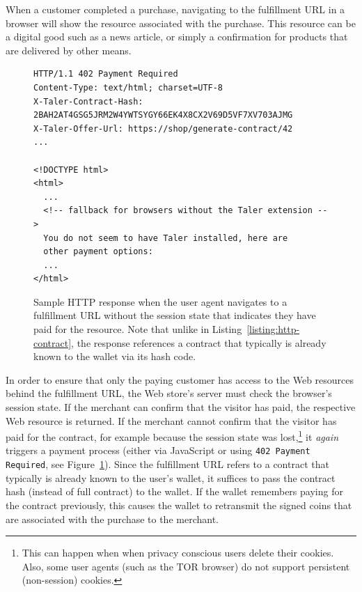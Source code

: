 \documentclass{llncs}
\begin{document}
When a customer completed a purchase, navigating to the fulfillment
URL in a browser will show the resource associated with the purchase.
This resource can be a digital good such as a news article, or simply
a confirmation for products that are delivered by other means.


\begin{figure}[t!]
\begin{lstlisting}
HTTP/1.1 402 Payment Required
Content-Type: text/html; charset=UTF-8
X-Taler-Contract-Hash: 2BAH2AT4GSG5JRM2W4YWTSYGY66EK4X8CX2V69D5VF7XV703AJMG
X-Taler-Offer-Url: https://shop/generate-contract/42
...

<!DOCTYPE html>
<html>
  ...
  <!-- fallback for browsers without the Taler extension -->
  You do not seem to have Taler installed, here are
  other payment options:
  ...
</html>
\end{lstlisting}
\caption{Sample HTTP response when the user agent navigates to a
  fulfillment URL without
  the session state that indicates they have paid for the resource.
  Note that unlike in Listing~\ref{listing:http-contract}, the response references
  a contract that typically is already known to the wallet via its hash code.}
  \label{listing:http-execute}
\end{figure}

In order to ensure that only the paying customer has access to the Web
resources behind the fulfillment URL, the Web store's server must
check the browser's session state.  If the merchant can confirm that
the visitor has paid, the respective Web resource is returned.  If the
merchant cannot confirm that the visitor has paid for the contract,
for example because the session state was lost,\footnote{This can
  happen when when privacy conscious users delete their cookies.
  Also, some user agents (such as the TOR browser) do not support
  persistent (non-session) cookies.} it {\em again} triggers a payment
process (either via JavaScript or using {\tt 402 Payment Required}, see Figure~\ref{listing:http-execute}).
Since the fulfillment URL refers to a contract that typically is already known
to the user's wallet, it suffices to pass the contract hash (instead of
full contract) to the wallet.
If the wallet remembers paying for the contract previously, this
causes the wallet to retransmit the signed coins that are associated
with the purchase to the merchant.
\end{document}
